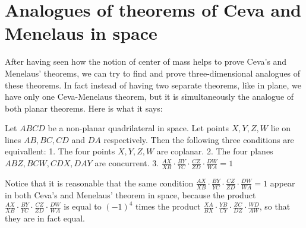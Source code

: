 \section{Analogues of theorems of Ceva and Menelaus in space}
After having seen how the notion of center of mass helps to prove Ceva's and Menelaus' theorems, we can try to find and prove three-dimensional analogues of these theorems. In fact instead of having two separate theorems, like in plane, we have only one Ceva-Menelaus theorem, but it is simultaneously the analogue of both planar theorems. Here is what it says:
\begin{theorem}
Let $ABCD$ be a non-planar quadrilateral in space. Let points $X,Y,Z,W$ lie on lines $AB,BC,CD$ and $DA$ respectively. Then the following three conditions are equivallent:
1. The four points $X,Y,Z,W$ are coplanar.
2. The four planes $ABZ,BCW,CDX,DAY$ are concurrent.
3. $\frac{AX}{XB}\cdot\frac{BY}{YC}\cdot\frac{CZ}{ZD}\cdot\frac{DW}{WA}=1$
\end{theorem}


Notice that it is reasonable that the same condition $\frac{AX}{XB}\cdot\frac{BY}{YC}\cdot\frac{CZ}{ZD}\cdot\frac{DW}{WA}=1$ appear in both Ceva's and Menelaus' theorem in space, because the product $\frac{AX}{XB}\cdot\frac{BY}{YC}\cdot\frac{CZ}{ZD}\cdot\frac{DW}{WA}$ is equal to $(-1)^4$ times the product $\frac{XA}{BX}\cdot\frac{YB}{CY}\cdot\frac{ZC}{DZ}\cdot\frac{WD}{AW}$, so that they are in fact equal.
